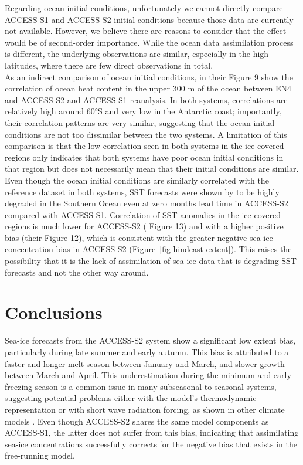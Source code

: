 \documentclass[tc, manuscript]{copernicus}
\begin{document}
Regarding ocean initial conditions, unfortunately we cannot directly
compare ACCESS-S1 and ACCESS-S2 initial conditions because those data
are currently not available. However, we believe there are reasons to
consider that the effect would be of second-order importance. While the
ocean data assimilation process is different, the underlying
observations are similar, especially in the high latitudes, where there
are few direct observations in total.\\
As an indirect comparison of ocean initial conditions, \citet{wedd2022}
in their Figure 9 show the correlation of ocean heat content in the
upper 300 m of the ocean between EN4 and ACCESS-S2 and ACCESS-S1
reanalysis. In both systems, correlations are relatively high around
60°S and very low in the Antarctic coast; importantly, their correlation
patterns are very similar, suggesting that the ocean initial conditions
are not too dissimilar between the two systems. A limitation of this
comparison is that the low correlation seen in both systems in the
ice-covered regions only indicates that both systems have poor ocean
initial conditions in that region but does not necessarily mean that
their initial conditions are similar. Even though the ocean initial
conditions are similarly correlated with the reference dataset in both
systems, SST forecasts were shown by \citet{wedd2022} to be highly
degraded in the Southern Ocean even at zero months lead time in
ACCESS-S2 compared with ACCESS-S1. Correlation of SST anomalies in the
ice-covered regions is much lower for ACCESS-S2 (\citet{wedd2022} Figure
13) and with a higher positive bias (their Figure 12), which is
consistent with the greater negative sea-ice concentration bias in
ACCESS-S2 (Figure~\ref{fig-hindcast-extent}). This raises the
possibility that it is the lack of assimilation of sea-ice data that is
degrading SST forecasts and not the other way around.

\FloatBarrier

\section{Conclusions}\label{conclusions}

Sea-ice forecasts from the ACCESS-S2 system show a significant low
extent bias, particularly during late summer and early autumn. This bias
is attributed to a faster and longer melt season between January and
March, and slower growth between March and April. This underestimation
during the minimum and early freezing season is a common issue in many
subseasonal-to-seasonal systems, suggesting potential problems either
with the model's thermodynamic representation or with short wave
radiation forcing, as shown in other climate models
\citep{zampieri2019, roach2020}. Even though ACCESS-S2 shares the same
model components as ACCESS-S1, the latter does not suffer from this
bias, indicating that assimilating sea-ice concentrations successfully
corrects for the negative bias that exists in the free-running model.
\end{document}
